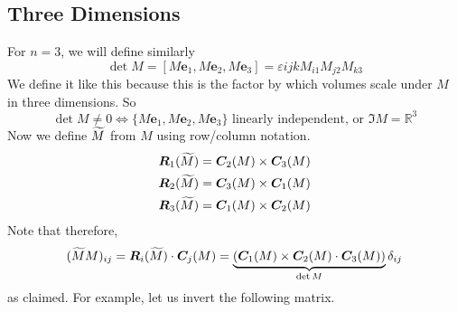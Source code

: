 \documentclass{article}
\begin{document}
	\subsection{Three Dimensions}
	For $n=3$, we will define similarly
	\[ \det M = [M\bm e_1, M\bm e_2, M\bm e_3] = \varepsilon{ijk}M_{i1}M_{j2}M_{k3} \]
	We define it like this because this is the factor by which volumes scale under $M$ in three dimensions. So
	\[ \det M \neq 0 \iff \{ M \bm e_1, M \bm e_2, M \bm e_3 \} \text{ linearly independent, or } \Im M = \mathbb R^3 \]
	Now we define $\widetilde{M}$ from $M$ using row/column notation.
	\begin{align*}
		\bm R_1(\widetilde{M}) &= \bm C_2(M) \times \bm C_3(M) \\
		\bm R_2(\widetilde{M}) &= \bm C_3(M) \times \bm C_1(M) \\
		\bm R_3(\widetilde{M}) &= \bm C_1(M) \times \bm C_2(M)
	\end{align*}
	Note that therefore,
	\[ (\widetilde{M} M)_{ij} = \bm R_i(\widetilde{M}) \cdot \bm C_j(M) = \underbrace{(\bm C_1(M) \times \bm C_2(M) \cdot \bm C_3(M))}_{\det M}\delta_{ij} \]
	as claimed. For example, let us invert the following matrix.
\end{document}
